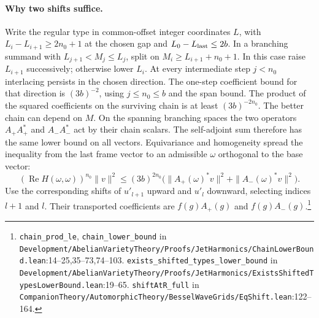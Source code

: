 \paragraph{Why two shifts suffice.}
Write the regular type in common-offset integer coordinates $L$, with $L_i-L_{i+1}\ge2n_0+1$ at the chosen gap and $L_0-L_{\rm last}\le2b$. In a branching summand with $L_{j+1}<M_j\le L_j$, split on $M_i\ge L_{i+1}+n_0+1$. In this case raise $L_{i+1}$ successively; otherwise lower $L_i$. At every intermediate step $j<n_0$ interlacing persists in the chosen direction. The one-step coefficient bound for that direction is $(3b)^{-2}$, using $j\le n_0\le b$ and the span bound. The product of the squared coefficients on the surviving chain is at least $(3b)^{-2n_0}$. The better chain can depend on $M$. On the spanning branching spaces the two operators $A_+A_+^*$ and $A_-A_-^*$ act by their chain scalars. The self-adjoint sum therefore has the same lower bound on all vectors. Equivariance and homogeneity spread the inequality from the last frame vector to an admissible $\omega$ orthogonal to the base vector:
\[
 (\operatorname{Re}H(\omega,\omega))^{n_0}\|v\|^2
 \le (3b)^{2n_0}\bigl(\|A_+(\omega)^*v\|^2+\|A_-(\omega)^*v\|^2\bigr).
\]
Use the corresponding shifts of $u'_{l+1}$ upward and $u'_l$ downward, selecting indices $l+1$ and $l$. Their transported coefficients are $f(g)A_+(g)$ and $f(g)A_-(g)$.\footnote{\nolinkurl{chain_prod_le}, \nolinkurl{chain_lower_bound} in \nolinkurl{Development/AbelianVarietyTheory/Proofs/JetHarmonics/ChainLowerBound.lean}\allowbreak:14--25,35--73,74--103. \nolinkurl{exists_shifted_types_lower_bound} in \nolinkurl{Development/AbelianVarietyTheory/Proofs/JetHarmonics/ExistsShiftedTypesLowerBound.lean}\allowbreak:19--65. \nolinkurl{shiftAtR_full} in \nolinkurl{CompanionTheory/AutomorphicTheory/BesselWaveGrids/EqShift.lean}\allowbreak:122--164.}

